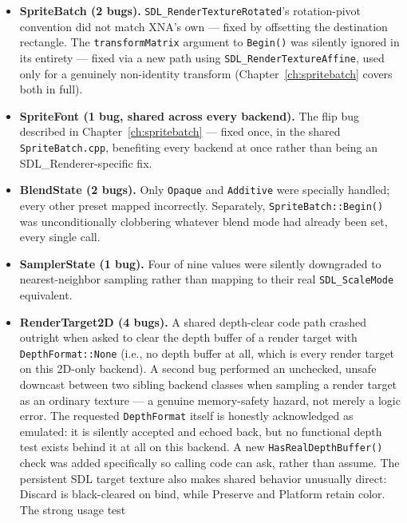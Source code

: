 \begin{itemize}
  \item \textbf{SpriteBatch (2 bugs).} \texttt{SDL\_RenderTextureRotated}'s rotation-pivot
        convention did not match XNA's own --- fixed by offsetting the destination
        rectangle. The \texttt{transformMatrix} argument to \texttt{Begin()} was silently
        ignored in its entirety --- fixed via a new path using
        \texttt{SDL\_RenderTextureAffine}, used only for a genuinely non-identity transform
        (Chapter~\ref{ch:spritebatch} covers both in full).
  \item \textbf{SpriteFont (1 bug, shared across every backend).} The
         flip bug described in Chapter~\ref{ch:spritebatch} ---
        fixed once, in the shared \texttt{SpriteBatch.cpp}, benefiting every backend at
        once rather than being an SDL\_Renderer-specific fix.
  \item \textbf{BlendState (2 bugs).} Only \texttt{Opaque} and \texttt{Additive} were
        specially handled; every other preset mapped incorrectly. Separately,
        \texttt{SpriteBatch::Begin()} was unconditionally clobbering whatever blend mode had
        already been set, every single call.
  \item \textbf{SamplerState (1 bug).} Four of nine  values were
        silently downgraded to nearest-neighbor sampling rather than mapping to their real
        \texttt{SDL\_ScaleMode} equivalent.
  \item \textbf{RenderTarget2D (4 bugs).} A shared depth-clear code path crashed outright
        when asked to clear the depth buffer of a render target with
        \texttt{DepthFormat::None} (i.e., no depth buffer at all, which is every render
        target on this 2D-only backend). A second bug performed an unchecked, unsafe
        downcast between two sibling backend classes when sampling a render target as an
        ordinary texture --- a genuine memory-safety hazard, not merely a logic error. The
        requested \texttt{DepthFormat} itself is honestly acknowledged as emulated: it is
        silently accepted and echoed back, but no functional depth test exists behind it at
        all on this backend. A new \texttt{HasRealDepthBuffer()} check was added specifically
        so calling code can ask, rather than assume. The persistent SDL target texture also
        makes shared  behavior unusually direct: Discard is
        black-cleared on bind, while Preserve and Platform retain color. The strong usage test

\end{itemize}
